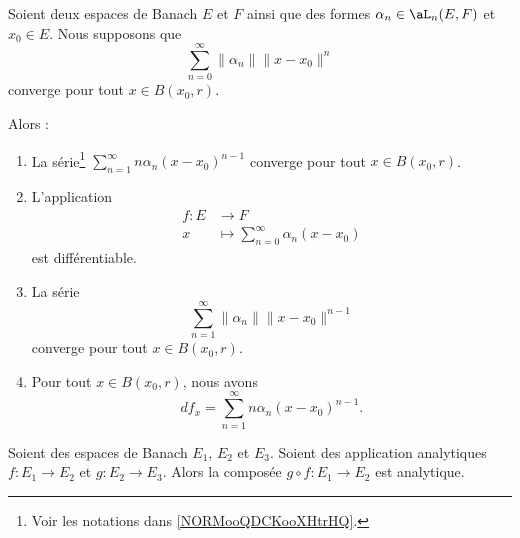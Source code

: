 \begin{theorem}	\label{THOooCESLooZxAzOg}
	Soient deux espaces de Banach \( E\) et \( F\) ainsi que des formes \( \alpha_n\in\aL_n(E,F)\) et \( x_0\in E\). Nous supposons que
	\begin{equation}
		\sum_{n=0}^{\infty}\| \alpha_n \|\| x-x_0 \|^n
	\end{equation}
	converge pour tout \( x\in B(x_0,r)\).

	Alors :
	\begin{enumerate}
		\item
		      La série\footnote{Voir les notations dans \ref{NORMooQDCKooXHtrHQ}.} \( \sum_{n=1}^{\infty}n\alpha_n(x-x_0)^{n-1}\) converge pour tout \( x\in B(x_0,r)\).
		\item
		      L'application
		      \begin{equation}
			      \begin{aligned}
				      f\colon E & \to F                                      \\
				      x         & \mapsto \sum_{n=0}^{\infty}\alpha_n(x-x_0)
			      \end{aligned}
		      \end{equation}
		      est différentiable.
		\item
		      La série
		      \begin{equation}
			      \sum_{n=1}^{\infty}\| \alpha_n \|\| x-x_0 \|^{n-1}
		      \end{equation}
		      converge pour tout \( x\in B(x_0,r)\).
		\item
		      Pour tout \( x\in B(x_0,r)\), nous avons
		      \begin{equation}
			      df_x=\sum_{n=1}^{\infty}n\alpha_n(x-x_0)^{n-1}.
		      \end{equation}
	\end{enumerate}
\end{theorem}


\begin{proposition}	\label{PROPooXKHBooQvvNmN}
	Soient des espaces de Banach \( E_1\), \( E_2\) et \( E_3\). Soient des application analytiques \(f \colon E_1\to E_2  \) et \(g \colon E_2\to E_3  \). Alors la composée \(g\circ f \colon E_1 \to E_2  \) est analytique.
\end{proposition}


